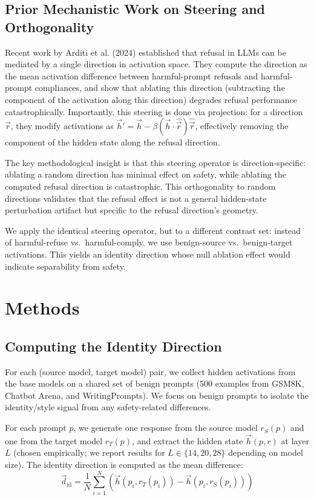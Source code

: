 \documentclass[letterpaper,twocolumn]{article}
\begin{document}
\subsection{Prior Mechanistic Work on Steering and Orthogonality}

Recent work by Arditi et al. (2024) established that refusal in LLMs can be mediated by a single direction in activation space. They compute the direction as the mean activation difference between harmful-prompt refusals and harmful-prompt compliances, and show that ablating this direction (subtracting the component of the activation along this direction) degrades refusal performance catastrophically. Importantly, this steering is done via projection: for a direction $\vec{r}$, they modify activations as $\vec{h}' = \vec{h} - \beta (\vec{h} \cdot \hat{\vec{r}}) \hat{\vec{r}}$, effectively removing the component of the hidden state along the refusal direction.

The key methodological insight is that this steering operator is direction-specific: ablating a random direction has minimal effect on safety, while ablating the computed refusal direction is catastrophic. This orthogonality to random directions validates that the refusal effect is not a general hidden-state perturbation artifact but specific to the refusal direction's geometry.

We apply the identical steering operator, but to a different contrast set: instead of harmful-refuse vs.\ harmful-comply, we use benign-source vs.\ benign-target activations. This yields an identity direction whose null ablation effect would indicate separability from safety.

\section{Methods}

\subsection{Computing the Identity Direction}

For each (source model, target model) pair, we collect hidden activations from the base models on a shared set of benign prompts (500 examples from GSM8K, Chatbot Arena, and WritingPrompts). We focus on benign prompts to isolate the identity/style signal from any safety-related differences.

For each prompt $p$, we generate one response from the source model $r_S(p)$ and one from the target model $r_T(p)$, and extract the hidden state $\vec{h}(p, r)$ at layer $L$ (chosen empirically; we report results for $L \in \{14, 20, 28\}$ depending on model size). The identity direction is computed as the mean difference:
\[
\vec{d}_{\text{id}} = \frac{1}{N} \sum_{i=1}^{N} (\vec{h}(p_i, r_T(p_i)) - \vec{h}(p_i, r_S(p_i)))
\]
\end{document}
